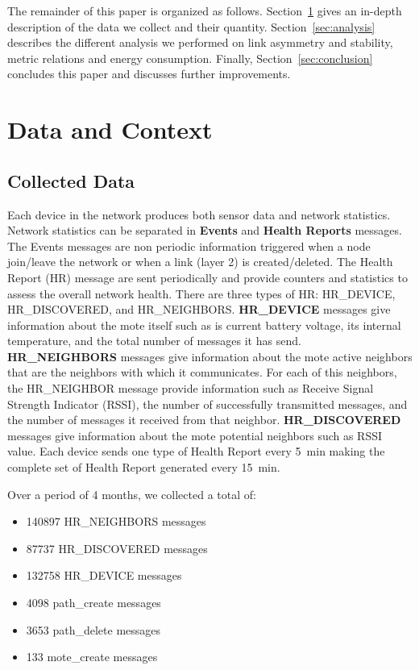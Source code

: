\documentclass{sig-alternate}
\begin{document}

The remainder of this paper is organized as follows.
Section~\ref{sec:collected} gives an in-depth description of the data we collect and their quantity.
Section~\ref{sec:analysis} describes the different analysis we performed on link asymmetry and stability, metric relations and energy consumption.
Finally, Section~\ref{sec:conclusion} concludes this paper and discusses further improvements.

\section{Data and Context}
\label{sec:collected}

\subsection{Collected Data}


Each device in the network produces both sensor data and network statistics.
Network statistics can be separated in \textbf{Events} and \textbf{Health Reports} messages.
The Events messages are non periodic information triggered when a node join/leave the network or when a link (layer 2) is created/deleted.
The Health Report (HR) message are sent periodically and provide counters and statistics to assess the overall network health.
There are three types of HR: HR\_DEVICE, HR\_DISCOVERED, and HR\_NEIGHBORS.
\textbf{HR\_DEVICE} messages give information about the mote itself such as is current battery voltage, its internal temperature, and the total number of messages it has send.
\textbf{HR\_NEIGHBORS} messages give information about the mote active neighbors that are the neighbors with which it communicates.
For each of this neighbors, the HR\_NEIGHBOR message provide information such as Receive Signal Strength Indicator (RSSI), the number of successfully transmitted messages, and the number of messages it received from that neighbor.
\textbf{HR\_DISCOVERED} messages give information about the mote potential neighbors such as RSSI value.
Each device sends one type of Health Report every 5~min making the complete set of Health Report generated every 15~min.


Over a period of 4 months, we collected a total of:
\begin{itemize}
    \item 140897 HR\_NEIGHBORS messages
    \item 87737 HR\_DISCOVERED messages
    \item 132758 HR\_DEVICE messages
    \item 4098 path\_create messages
    \item 3653 path\_delete messages
    \item 133 mote\_create messages
\end{itemize}
\end{document}
